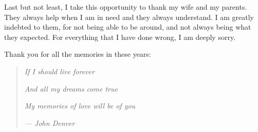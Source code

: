 \begin{acknowledgements}
Last but not least, I take this opportunity to thank my wife and my parents. They always help when I am in need and they always understand. I am greatly indebted to them, for not being able to be around, and not always being what they expected. For everything that I have done wrong, I am deeply sorry.

Thank you for all the memories in these years:
\begin{quote}
\textit{If I should live forever}

\textit{And all my dreams come true}

\textit{My memories of love will be of you}

\textit{--- John Denver}
\end{quote}

\end{acknowledgements}





